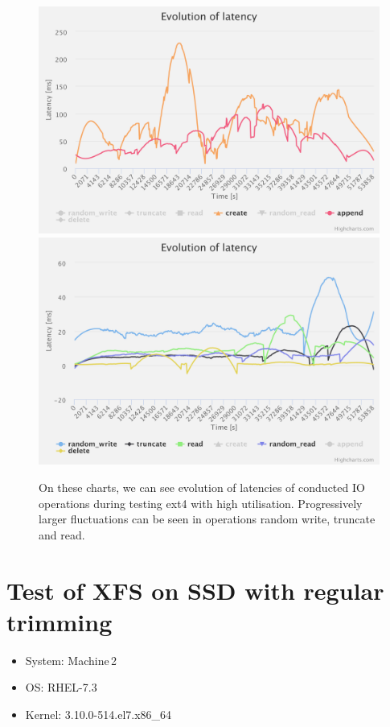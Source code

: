 \documentclass[
  color, %
  table, %
  lof,   %
  lot,   %
]{fithesis3}
\begin{document}
\begin{figure}[!htb]
    \centering
   \begin{minipage}{\textwidth}
        \centering
        \includegraphics[width=\textwidth]{../charts/HDD_ext4/ca}
        \includegraphics[width=\textwidth]{../charts/HDD_ext4/o}
                \caption[Evolution of latencies of ext4 during testing of high utilisation of HDD]{On these charts, we can see evolution of latencies of conducted IO operations during testing ext4 with high utilisation. Progressively larger fluctuations can be seen in operations random write, truncate and read.}
\label{fig:lats_ext4}
    \end{minipage}
\end{figure}

\clearpage



\section{Test of XFS on SSD with regular trimming}
\begin{itemize}
\itemsep0em 
   \item System: Machine\,2
   \item OS: RHEL-7.3
   \item Kernel: 3.10.0-514.el7.x86\_64
\end{itemize}
\end{document}
